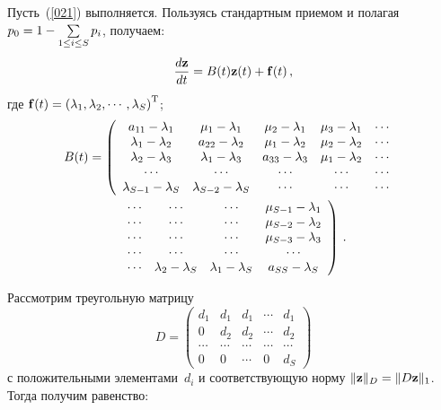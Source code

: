 \begin{multicols}{2}
Пусть~(\ref{021}) выполняется. Пользуясь стандартным приемом и
полагая $p_0\hm=1\hm-\sum\limits_{1\le i \le S}{p_i}$, получаем:
\begin{equation*}
\displaystyle\frac{\displaystyle d{\bf z}\mathstrut}{\displaystyle dt\mathstrut}=B(t){\bf z}(t)+{\bf f}(t)\,,
\end{equation*}
где ${\mathbf f}(t)=\left(\lambda_1, \lambda_2,\cdots,\lambda_S \right)^{\mathrm{T}}$;
\begin{multline*}
\hspace*{-3mm}B(t)=\left(
\begin{array}{ccccc}
a_{11}- \la_1   & \mu_1 - \la_1   & \mu_2 - \la_1   & \mu_3 -\la_1   & \cdots\\
\la_1 -\la_2    & a_{22} -\la_2  & \mu_1-\la_2   & \mu_2 -\la_2      & \cdots\\
\la_2 -\la_3    & \la_1 -\la_3   & a_{33} -\la_3  & \mu_1-\la_2      & \cdots\\
\cdots &\cdots&\cdots&\cdots                                         &\cdots \\
\la_{S-1} -\la_S  &\la_{S-2} -\la_S & \cdots & \cdots                &\cdots
\end{array}
\right.\hspace*{-4.8643pt}\\
\left.
\begin{array}{cccc}
\cdots & \cdots &\cdots& \mu_{S-1}-\lambda_1\\
\cdots&\cdots&  \cdots & \mu_{S-2} -\la_2 \\
\cdots &\cdots&\cdots& \mu_{S-3}-\lambda_3\\
\cdots&\cdots&\cdots&\cdots\\
\cdots& \la_2-\la_S&\la_1-\la_S& a_{SS}-\la_S
\end{array}
\right)\,.
\end{multline*}

Рассмотрим треугольную матрицу
\begin{equation*}
D=\begin{pmatrix}
d_1   & d_1 & d_1 & \cdots & d_1 \\
0   & d_2  & d_2  &   \cdots & d_2 \\
\cdots &\cdots & \cdots & \cdots&\cdots\\
0  & 0 & \cdots & 0 &  d_S
\end{pmatrix}
\end{equation*}
с положительными элементами~$d_i$ и соответст\-ву\-ющую норму
 $\|{\bf z}\|_{D}\hm =\|D {\bf z}\|_1$.
Тогда получим равенство:

\pagebreak

\end{multicols}

